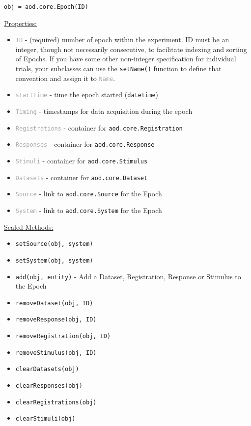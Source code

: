 \documentclass[10pt]{exam}
\newcommand\aodclass[1]{\textcolor{codeblue}{\texttt{#1}}}
\newcommand\aodprop[1]{\textcolor{darkgray}{\texttt{#1}}}
\newcommand\aodfcn[1]{\textcolor{darkteal}{\texttt{#1}}}
\newcommand\docheader[1]{\vspace{0.6ex}\noindent\underline{#1}\vspace{0.15ex}}
\begin{document}
		\begin{lstlisting}[style=matlab-editor, basicstyle=\mlttfamily\footnotesize]
obj = aod.core.Epoch(ID)
		\end{lstlisting}
		\docheader{Properties:}
		\begin{itemize}
			\item \aodprop{ID} - (required) number of epoch within the experiment. ID must be an integer, though not necessarily consecutive, to facilitate indexing and sorting of Epochs. If you have some other non-integer specification for individual trials, your subclasses can use the \aodfcn{setName()} function to define that convention and assign it to \aodprop{Name}. 
			\item \aodprop{startTime} - time the epoch started (\aodclass{datetime})
			\item \aodprop{Timing} - timestamps for data acquisition during the epoch
			\item \aodprop{Registrations} - container for \aodclass{aod.core.Registration}
			\item \aodprop{Responses} - container for \aodclass{aod.core.Response}
			\item \aodprop{Stimuli} - container for \aodclass{aod.core.Stimulus}
			\item \aodprop{Datasets} - container for \aodclass{aod.core.Dataset}
			\item \aodprop{Source} - link to \aodclass{aod.core.Source} for the Epoch
			\item \aodprop{System} - link to \aodclass{aod.core.System} for the Epoch
		\end{itemize}	
		\docheader{Sealed Methods:}
		\begin{itemize}
			\item \aodfcn{setSource(obj, system)}
			\item \aodfcn{setSystem(obj, system)}
			\item \aodfcn{add(obj, entity)} - Add a Dataset, Registration, Response or Stimulus to the Epoch\\
			\item \aodfcn{removeDataset(obj, ID)}
			\item \aodfcn{removeResponse(obj, ID)}
			\item \aodfcn{removeRegistration(obj, ID)}
			\item \aodfcn{removeStimulus(obj, ID)}
			\item \aodfcn{clearDatasets(obj)}
			\item \aodfcn{clearResponses(obj)}
			\item \aodfcn{clearRegistrations(obj)}
			\item \aodfcn{clearStimuli(obj)}
		\end{itemize}	
\end{document}
